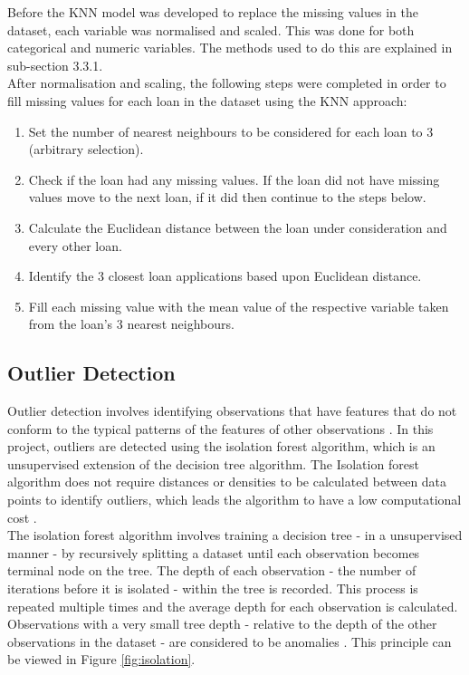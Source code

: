\vspace{10pt}

Before the KNN model was developed to replace the missing values in the dataset, each variable was normalised and scaled. This was done for both categorical and numeric variables. The methods used to do this are explained in sub-section 3.3.1.\\

After normalisation and scaling, the following steps were completed in order to fill missing values for each loan in the dataset using the KNN approach: 

\begin{enumerate}
    \item Set the number of nearest neighbours to be considered for each loan to 3 (arbitrary selection).
    \item Check if the loan had any missing values. If the loan did not have missing values move to the next loan, if it did then continue to the steps below. 
    \item Calculate the Euclidean distance between the loan under consideration and every other loan. 
    \item Identify the 3 closest loan applications based upon Euclidean distance. 
    \item Fill each missing value with the mean value of the respective variable taken from the loan's 3 nearest neighbours. 
\end{enumerate}

\subsection{Outlier Detection}

Outlier detection involves identifying observations that have features that do not conform to the typical patterns of the features of other observations \parencite{Outlier1}. In this project, outliers are detected using the isolation forest algorithm, which is an unsupervised extension of the decision tree algorithm. The Isolation forest algorithm does not require distances or densities to be calculated between data points to identify outliers, which leads the algorithm to have a low computational cost \parencite{Outlier2}.  \\

The isolation forest algorithm involves training a decision tree - in a unsupervised manner - by recursively splitting a dataset until each observation becomes terminal node on the tree. The depth of each observation - the number of iterations before it is isolated - within the tree is recorded. This process is repeated multiple times and the average depth for each observation is calculated. Observations with a very small tree depth - relative to the depth of the other observations in the dataset - are considered to be anomalies \parencite{Outlier2}. This principle can be viewed in Figure \ref{fig:isolation}. \\

